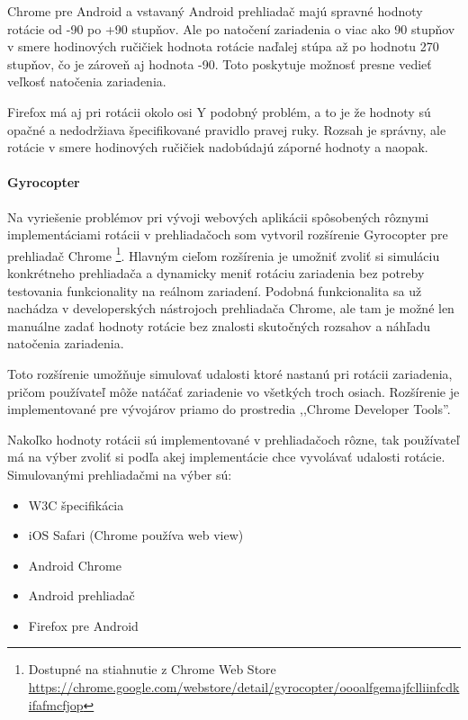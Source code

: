 Chrome pre Android a vstavaný Android prehliadač majú spravné hodnoty rotácie od -90 po +90 stupňov. Ale po natočení zariadenia o viac ako 90 stupňov v smere hodinových ručičiek hodnota rotácie naďalej stúpa až po hodnotu 270 stupňov, čo je zároveň aj hodnota -90. Toto poskytuje možnosť presne vedieť veľkosť natočenia zariadenia.

Firefox má aj pri rotácii okolo osi Y podobný problém, a to je že hodnoty sú opačné a nedodržiava špecifikované pravidlo pravej ruky. Rozsah je správny, ale rotácie v smere hodinových ručičiek nadobúdajú záporné hodnoty a naopak.



\paragraph{Gyrocopter} %
\label{par:gyrocopter}

Na vyriešenie problémov pri vývoji webových aplikácii spôsobených rôznymi implementáciami rotácii v prehliadačoch som vytvoril rozšírenie Gyrocopter pre prehliadač Chrome \footnote{Dostupné na stiahnutie z Chrome Web Store \url{https://chrome.google.com/webstore/detail/gyrocopter/oooalfgemajfclliinfcdkifafmcfjop}}. Hlavným cieľom rozšírenia je umožniť zvoliť si simuláciu konkrétneho prehliadača a dynamicky meniť rotáciu zariadenia bez potreby testovania funkcionality na reálnom zariadení. Podobná funkcionalita sa už nachádza v developerských nástrojoch prehliadača Chrome, ale tam je možné len manuálne zadať hodnoty rotácie bez znalosti skutočných rozsahov a náhľadu natočenia zariadenia.

Toto rozšírenie umožňuje simulovať udalosti ktoré nastanú pri rotácii zariadenia, pričom používateľ môže natáčať zariadenie vo všetkých troch osiach. Rozšírenie je implementované pre vývojárov priamo do prostredia ,,Chrome Developer Tools''.

Nakoľko hodnoty rotácii sú implementované v prehliadačoch rôzne, tak používateľ má na výber zvoliť si podľa akej implementácie chce vyvolávať udalosti rotácie. Simulovanými prehliadačmi na výber sú:

\begin{itemize}
  \item W3C špecifikácia
  \item iOS Safari (Chrome používa web view)
  \item Android Chrome
  \item Android prehliadač
  \item Firefox pre Android
\end{itemize}

